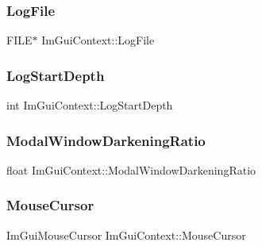 \subsubsection{\texorpdfstring{Log\+File}{LogFile}}
{\footnotesize\ttfamily F\+I\+LE$\ast$ Im\+Gui\+Context\+::\+Log\+File}

\hypertarget{struct_im_gui_context_a6ac157821b3a0eb9d0411bc477df8665}{}\label{struct_im_gui_context_a6ac157821b3a0eb9d0411bc477df8665} 
\subsubsection{\texorpdfstring{Log\+Start\+Depth}{LogStartDepth}}
{\footnotesize\ttfamily int Im\+Gui\+Context\+::\+Log\+Start\+Depth}

\hypertarget{struct_im_gui_context_ac4088a7de19357cdfeb3ead2d53ffcd8}{}\label{struct_im_gui_context_ac4088a7de19357cdfeb3ead2d53ffcd8} 
\subsubsection{\texorpdfstring{Modal\+Window\+Darkening\+Ratio}{ModalWindowDarkeningRatio}}
{\footnotesize\ttfamily float Im\+Gui\+Context\+::\+Modal\+Window\+Darkening\+Ratio}

\hypertarget{struct_im_gui_context_ab60730c7f9f601fd0b22dac060a822e3}{}\label{struct_im_gui_context_ab60730c7f9f601fd0b22dac060a822e3} 
\subsubsection{\texorpdfstring{Mouse\+Cursor}{MouseCursor}}
{\footnotesize\ttfamily Im\+Gui\+Mouse\+Cursor Im\+Gui\+Context\+::\+Mouse\+Cursor}

\hypertarget{struct_im_gui_context_a244c1b68fdb7da04de90d5becd5a5777}{}\label{struct_im_gui_context_a244c1b68fdb7da04de90d5becd5a5777} 
